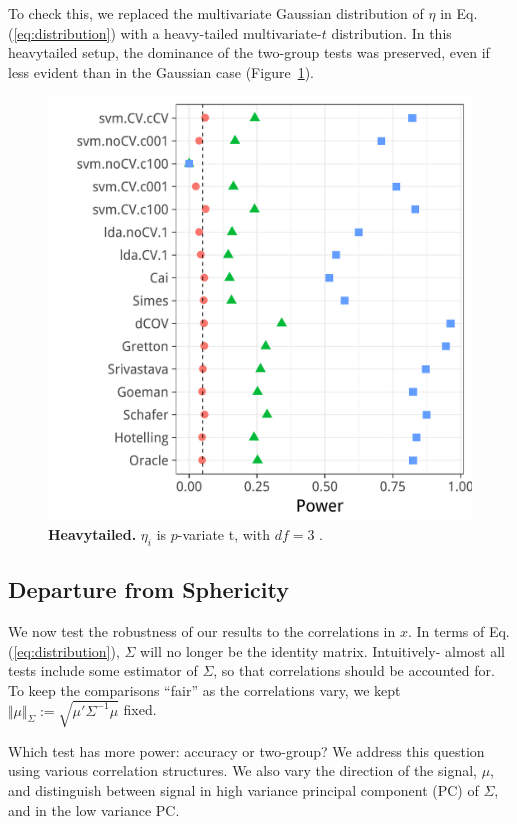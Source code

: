 \documentclass[journal]{IEEEtran}
\begin{document}
To check this, we replaced the multivariate Gaussian distribution of $\eta$ in Eq.(\ref{eq:distribution}) with a heavy-tailed multivariate-$t$ distribution. 
In this heavytailed setup, the dominance of the two-group tests was preserved, even if less evident than in the Gaussian case (Figure~\ref{fig:t_null}).



\begin{figure}[th]
	\centering
	\includegraphics[width=0.7\columnwidth]{"art/file9"}
	\caption{\textbf{Heavytailed.} $\eta_i$ is $p$-variate t, with $df=3$ .  } 
	\label{fig:t_null}
\end{figure}




\subsection{Departure from Sphericity}
\label{sec:dependence}

We now test the robustness of our results to the correlations in $x$. 
In terms of Eq.(\ref{eq:distribution}), $\Sigma$ will no longer be the identity matrix. 
Intuitively- almost all tests include some estimator of $\Sigma$, so that correlations should be accounted for.
To keep the comparisons ``fair'' as the correlations vary, we kept $\Vert \mu \Vert_\Sigma:=\sqrt{\mu'\Sigma^{-1}\mu}$ fixed. 

Which test has more power: accuracy or two-group?
We address this question using various correlation structures.
We also vary the direction of the signal, $\mu$, and distinguish between signal in high variance principal component (PC) of $\Sigma$, and in the low variance PC. 
\end{document}
